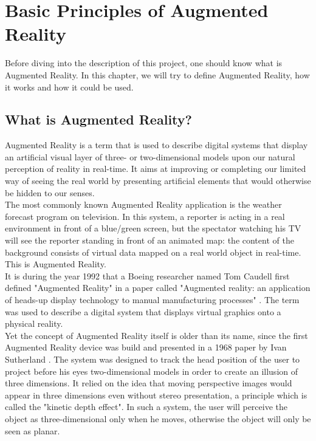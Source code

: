 \chapter{Basic Principles of Augmented Reality}
\label{cha:basic_principles}

Before diving into the description of this project, one should know what is Augmented Reality. In this chapter, we will try to define Augmented Reality, how it works and how it could be used.

\section{What is Augmented Reality?}
\label{sec:what_is_ar}

Augmented Reality is a term that is used to describe digital systems that display an artificial visual layer of three- or two-dimensional models upon our natural perception of reality in real-time. It aims at improving or completing our limited way of seeing the real world by presenting artificial elements that would otherwise be hidden to our senses.\\

The most commonly known Augmented Reality application is the weather forecast program on television. In this system, a reporter is acting in a real environment in front of a blue/green screen, but the spectator watching his TV will see the reporter standing in front of an animated map: the content of the background consists of virtual data mapped on a real world object in real-time. This is Augmented Reality. \\

It is during the year 1992 that a Boeing researcher named Tom Caudell first defined "Augmented Reality" in a paper called "Augmented reality: an application of heads-up display technology to manual manufacturing processes" \cite{Cau92}. The term was used to describe a digital system that displays virtual graphics onto a physical reality.\\

Yet the concept of Augmented Reality itself is older than its name, since the first Augmented Reality device was build and presented in a 1968 paper by Ivan Sutherland \cite{Sut68}. The system was designed to track the head position of the user to project before his eyes two-dimensional models in order to create an illusion of three dimensions. It relied on the idea that moving perspective images would appear in three dimensions even without stereo presentation, a principle which is called the "kinetic depth effect". In such a system, the user will perceive the object as three-dimensional only when he moves, otherwise the object will only be seen as planar.\\

